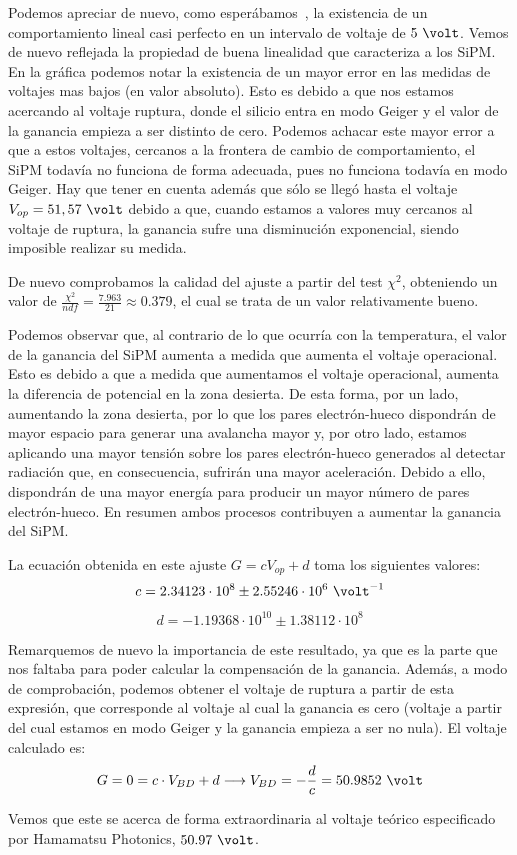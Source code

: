 \begin{itemize}
Podemos apreciar de nuevo, como esperábamos~\cite{tesisSiPM}, la existencia de un comportamiento  lineal casi perfecto en un intervalo de voltaje de $5~\volt$. Vemos de nuevo reflejada la propiedad de buena linealidad que caracteriza a los SiPM. En la gráfica podemos notar la existencia de un mayor error en las medidas de voltajes mas bajos (en valor absoluto). Esto es debido a que nos estamos acercando al voltaje ruptura, donde el silicio entra en modo Geiger y el valor de la ganancia empieza a ser distinto de cero. Podemos achacar este mayor error a que a estos voltajes, cercanos a la frontera de cambio de comportamiento, el SiPM todavía no funciona de forma adecuada,  pues no funciona todavía en  modo Geiger. Hay que tener en cuenta además que sólo se llegó hasta el voltaje $V_{op}=51,57~\volt$  debido a que, cuando estamos a valores muy cercanos al voltaje de ruptura,  la ganancia sufre una disminución exponencial, siendo imposible realizar su medida.

De nuevo comprobamos la calidad del ajuste a partir del test $\chi^2$, obteniendo un valor de $\frac{\chi^2}{ndf}=\frac{7.963}{21}\approx 0.379$, el cual se trata de un valor relativamente bueno.

Podemos observar que, al contrario de lo que ocurría con la temperatura, el valor de la ganancia del SiPM aumenta a medida que aumenta el voltaje operacional. Esto es debido a que a medida que aumentamos el voltaje operacional, aumenta la diferencia de potencial en la zona desierta. De esta forma, por un lado, aumentando la zona desierta, por lo que los pares electrón-hueco dispondrán de mayor espacio para generar una avalancha mayor  y, por otro lado, estamos aplicando una mayor tensión sobre los pares electrón-hueco generados al detectar radiación que,  en consecuencia, sufrirán una mayor aceleración. Debido a ello, dispondrán de una mayor energía para producir un mayor número de pares electrón-hueco. En resumen ambos procesos contribuyen a aumentar la ganancia del SiPM.

La ecuación obtenida en este ajuste $G=cV_{op}+d$ toma los siguientes valores: 
\begin{equation}
c=2.34123 \cdot 10^8 \pm 2.55246 \cdot 10^6~\volt^{-1}
\label{ajustependientevoltaje}
\end{equation}
\begin{equation}
d=-1.19368 \cdot 10^{10} \pm 1.38112 \cdot 10^8
\label{ajusteordenadavoltaje}
\end{equation}

Remarquemos de nuevo la importancia de este resultado, ya que es la parte que nos faltaba para poder calcular la compensación de la ganancia.
Además, a modo de comprobación, podemos obtener el voltaje de ruptura a partir de esta expresión, que corresponde al voltaje al cual la ganancia es cero (voltaje a partir del cual estamos en modo Geiger y la ganancia empieza a ser no nula). El voltaje calculado es: 
\begin{equation}
G=0=c \cdot V_{BD} +d \longrightarrow V_{BD}=-\frac{d}{c}=50.9852~\volt
\label{ajustebdv}
\end{equation}

Vemos que este se acerca de forma extraordinaria al voltaje teórico especificado por Hamamatsu Photonics, $50.97~\volt$.
\end{itemize}